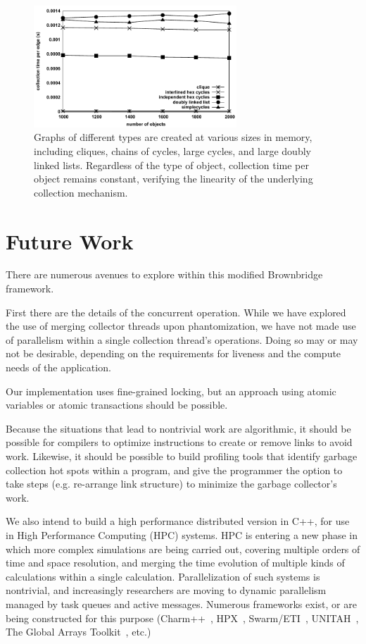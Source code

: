 \begin{figure}[h!]
  \centering
  \includegraphics[height=1.8in,width=3.0in]{figs/linearity}
  \caption{
  Graphs of different types are created at various sizes in memory,
  including cliques, chains of cycles, large cycles, and large doubly
  linked lists. Regardless of the type of object, collection time
  per object remains constant, verifying the linearity of the underlying
  collection mechanism.
  }
   \label{fig:linearity}
  \end{figure}

\section{Future Work}
\label{section:future-work}
There are numerous avenues to explore within this modified Brownbridge framework.

First there are the details of the concurrent operation. While we have explored
the use of merging collector threads upon phantomization, we have not
made use of parallelism within a single collection thread's operations.
Doing so may or may not be desirable, depending on the requirements
for liveness and the compute needs of the application.

Our implementation uses fine-grained locking, but an approach using atomic
variables or atomic transactions should be possible.

Because the situations that lead to nontrivial work are algorithmic, it
should be possible for compilers to optimize instructions to create or
remove links to avoid work. Likewise, it should be possible to build
profiling tools that identify garbage collection
hot spots within a program, and give the programmer the option to take
steps (e.g. re-arrange link structure) to minimize the garbage collector's work.

We also intend to build a high performance distributed version in C++, for
use in High Performance Computing (HPC) systems.
HPC is entering a new phase  in which more complex
simulations are being carried out, covering multiple orders of time and space resolution, and
merging the time evolution of multiple kinds of calculations within a single
calculation. Parallelization of such systems is nontrivial, and increasingly
researchers are moving to dynamic parallelism managed by task queues and
active messages. Numerous frameworks exist,
or are being constructed for this purpose (Charm++~\cite{kale1993charm++},
HPX~\cite{kaiser2009parallex}, Swarm/ETI~\cite{lauderdale2012towards},
UNITAH~\cite{berzins2010uintah}, The Global Arrays
Toolkit~\cite{nieplocha1994global}, etc.)

